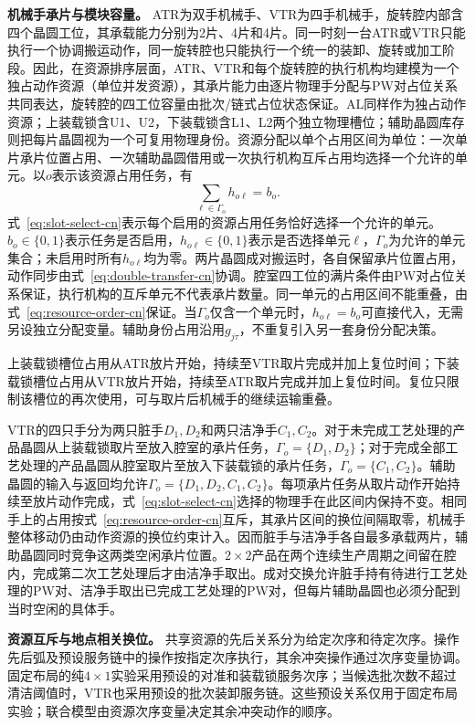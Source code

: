 \documentclass[final,5p,times,twocolumn]{elsarticle}
\begin{document}
\noindent\textbf{机械手承片与模块容量。}
ATR为双手机械手、VTR为四手机械手，旋转腔内部含四个晶圆工位，其承载能力分别为2片、4片和4片。同一时刻一台ATR或VTR只能执行一个协调搬运动作，同一旋转腔也只能执行一个统一的装卸、旋转或加工阶段。因此，在资源排序层面，ATR、VTR和每个旋转腔的执行机构均建模为一个独占动作资源（单位并发资源），其承片能力由逐片物理手分配与PW对占位关系共同表达，旋转腔的四工位容量由批次/链式占位状态保证。AL同样作为独占动作资源；上装载锁含U1、U2，下装载锁含L1、L2两个独立物理槽位；辅助晶圆库存则把每片晶圆视为一个可复用物理身份。资源分配以单个占用区间为单位：一次单片承片位置占用、一次辅助晶圆借用或一次执行机构互斥占用均选择一个允许的单元。以$o$表示该资源占用任务，有
\begin{equation}
\sum_{\ell\in\Gamma_o}h_{o\ell}=b_o.
\label{eq:slot-select-cn}
\end{equation}
式~\eqref{eq:slot-select-cn}表示每个启用的资源占用任务恰好选择一个允许的单元。$b_o\in\{0,1\}$表示任务是否启用，$h_{o\ell}\in\{0,1\}$表示是否选择单元$\ell$，$\Gamma_o$为允许的单元集合；未启用时所有$h_{o\ell}$均为零。两片晶圆成对搬运时，各自保留承片位置占用，动作同步由式~\eqref{eq:double-transfer-cn}协调。腔室四工位的满片条件由PW对占位关系保证，执行机构的互斥单元不代表承片数量。同一单元的占用区间不能重叠，由式~\eqref{eq:resource-order-cn}保证。当$\Gamma_o$仅含一个单元时，$h_{o\ell}=b_o$可直接代入，无需另设独立分配变量。辅助身份占用沿用$g_{j\tau}$，不重复引入另一套身份分配决策。

上装载锁槽位占用从ATR放片开始，持续至VTR取片完成并加上复位时间；下装载锁槽位占用从VTR放片开始，持续至ATR取片完成并加上复位时间。复位只限制该槽位的再次使用，可与取片后机械手的继续运输重叠。

VTR的四只手分为两只脏手$D_1,D_2$和两只洁净手$C_1,C_2$。对于未完成工艺处理的产品晶圆从上装载锁取片至放入腔室的承片任务，$\Gamma_o=\{D_1,D_2\}$；对于完成全部工艺处理的产品晶圆从腔室取片至放入下装载锁的承片任务，$\Gamma_o=\{C_1,C_2\}$。辅助晶圆的输入与返回均允许$\Gamma_o=\{D_1,D_2,C_1,C_2\}$。每项承片任务从取片动作开始持续至放片动作完成，式~\eqref{eq:slot-select-cn}选择的物理手在此区间内保持不变。相同手上的占用按式~\eqref{eq:resource-order-cn}互斥，其承片区间的换位间隔取零，机械手整体移动仍由动作资源的换位约束计入。因而脏手与洁净手各自最多承载两片，辅助晶圆同时竞争这两类空闲承片位置。$2\times2$产品在两个连续生产周期之间留在腔内，完成第二次工艺处理后才由洁净手取出。成对交换允许脏手持有待进行工艺处理的PW对、洁净手取出已完成工艺处理的PW对，但每片辅助晶圆也必须分配到当时空闲的具体手。

\noindent\textbf{资源互斥与地点相关换位。}
共享资源的先后关系分为给定次序和待定次序。操作先后弧及预设服务链中的操作按指定次序执行，其余冲突操作通过次序变量协调。固定布局的纯$4\times1$实验采用预设的对准和装载锁服务次序；当候选批次数不超过清洁阈值时，VTR也采用预设的批次装卸服务链。这些预设关系仅用于固定布局实验；联合模型由资源次序变量决定其余冲突动作的顺序。
\end{document}
